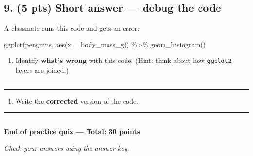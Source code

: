 \documentclass[
  11pt,
  letterpaper,
  DIV=11,
  numbers=noendperiod]{scrartcl}
\newenvironment{Shaded}{\begin{snugshade}}{\end{snugshade}}
\newcommand{\AttributeTok}[1]{\textcolor[rgb]{0.40,0.45,0.13}{#1}}
\newcommand{\FunctionTok}[1]{\textcolor[rgb]{0.28,0.35,0.67}{#1}}
\newcommand{\NormalTok}[1]{\textcolor[rgb]{0.00,0.23,0.31}{#1}}
\newcommand{\SpecialCharTok}[1]{\textcolor[rgb]{0.37,0.37,0.37}{#1}}
\providecommand{\tightlist}{%
  \setlength{\itemsep}{0pt}\setlength{\parskip}{0pt}}
\begin{document}
\vspace{0.5em}

\subsection{9. (5 pts) Short answer --- debug the code}

A classmate runs this code and gets an error:

\begin{Shaded}
\begin{Highlighting}[]
\FunctionTok{ggplot}\NormalTok{(penguins, }\FunctionTok{aes}\NormalTok{(}\AttributeTok{x =}\NormalTok{ body\_mass\_g)) }\SpecialCharTok{\%\textgreater{}\%}
  \FunctionTok{geom\_histogram}\NormalTok{()}
\end{Highlighting}
\end{Shaded}

\vspace{0.25em}

\begin{enumerate}
\def\labelenumi{(\alph{enumi})}
\tightlist
\item Identify \textbf{what's wrong} with this code. (Hint: think about how \texttt{ggplot2} layers are joined.)
\end{enumerate}

\vspace{0.5em}

\rule{6.5in}{0.4pt}

\vspace{0.75em}

\rule{6.5in}{0.4pt}

\vspace{0.5em}

\begin{enumerate}
\def\labelenumi{(\alph{enumi})}
\setcounter{enumi}{1}
\tightlist
\item Write the \textbf{corrected} version of the code.
\end{enumerate}

\vspace{1em}

\rule{6.5in}{0.4pt}

\vspace{1em}

\rule{6.5in}{0.4pt}

\vspace{1em}

\vspace{0.5em}

\begin{center}
\textbf{End of practice quiz --- Total: 30 points}

\textit{Check your answers using the answer key.}
\end{center}
\end{document}
